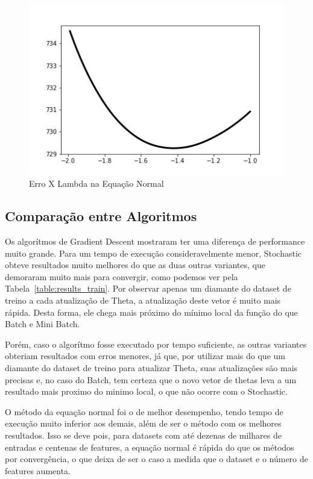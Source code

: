 \documentclass[conference]{IEEEtran}
\begin{document}
\begin{figure}[H]
  \includegraphics[width=\linewidth]{gfx/normaleq_lambdaxcost_1.png}
  \caption{Erro X Lambda na Equação Normal}
  \label{fig:reg}
\end{figure}

\subsection{Comparação entre Algoritmos}

Os algorítmos de Gradient Descent mostraram ter uma diferença de performance muito grande. Para um tempo de execução consideravelmente menor, Stochastic obteve resultados muito melhores do que as duas outras variantes, que demoraram muito mais para convergir, como podemos ver pela Tabela~\ref{table:results_train}. Por observar apenas um diamante do dataset de treino a cada atualização de Theta, a atualização deste vetor é muito mais rápida. Desta forma, ele chega mais próximo do mínimo local da função do que Batch e Mini Batch.

Porém, caso o algorítmo fosse executado por tempo suficiente, as outras variantes obteriam resultados com erros menores, já que, por utilizar mais do que um diamante do dataset de treino para atualizar Theta, suas atualizações são mais precisas e, no caso do Batch, tem certeza que o novo vetor de thetas leva a um resultado mais proximo do minimo local, o que não ocorre com o Stochastic.

O método da equação normal foi o de melhor desempenho, tendo tempo de execução muito inferior aos demais, além de ser o método com os melhores resultados. Isso se deve pois, para datasets com até dezenas de milhares de entradas e centenas de features, a equação normal é rápida do que os métodos por convergência, o que deixa de ser o caso a medida que o dataset e o número de features aumenta.
\end{document}
